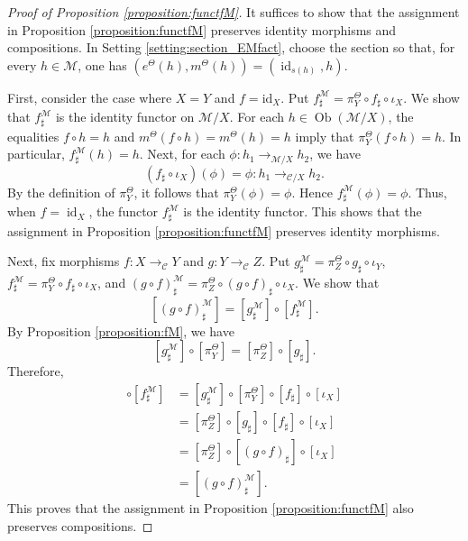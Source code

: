 \documentclass[12pt, a4paper]{amsart}
\theoremstyle{definition}
\newcommand{\id}{\mathop{\mathrm{id}}\nolimits}
\newcommand{\Ob}{\mathop{\mathrm{Ob}}\nolimits}
\begin{document}
\begin{proof}[Proof of Proposition \ref{proposition:functfM}]
It suffices to show that the assignment in Proposition \ref{proposition:functfM} preserves identity morphisms and compositions. In Setting \ref{setting:section_EMfact}, choose the section so that, for every $h \in \mathcal{M}$, one has $(e^\Theta(h),m^\Theta(h)) = (\id_{s(h)},h)$.

First, consider the case where $X = Y$ and $f = \mathrm{id}_X$. Put $f^{\mathcal{M}}_\sharp = \pi_Y^\Theta \circ f_\sharp \circ \iota_X$. We show that $f^\mathcal{M}_\sharp$ is the identity functor on $\mathcal{M}/X$. For each $h \in \Ob(\mathcal{M}/X)$, the equalities $f \circ h = h$ and $m^{\Theta}(f \circ h) = m^{\Theta}(h) = h$ imply that $\pi^\Theta_Y(f \circ h) = h$. In particular, $f^{\mathcal{M}}_\sharp(h) = h$. Next, for each $\phi : h_1 \rightarrow_{\mathcal{M}/X} h_2$, we have
\[
(f_\sharp \circ \iota_X)(\phi) = \phi : h_1 \rightarrow_{\mathcal{C}/X} h_2.
\]
By the definition of $\pi^\Theta_Y$, it follows that $\pi^\Theta_Y(\phi) = \phi$. Hence $f^\mathcal{M}_\sharp(\phi) = \phi$. Thus, when $f = \id_X$, the functor $f^{\mathcal{M}}_\sharp$ is the identity functor. This shows that the assignment in Proposition \ref{proposition:functfM} preserves identity morphisms.

Next, fix morphisms $f : X \rightarrow_{\mathcal{C}} Y$ and $g : Y \rightarrow_{\mathcal{C}} Z$. Put $g^\mathcal{M}_\sharp = \pi^\Theta_Z \circ g_\sharp \circ \iota_Y$, $f^\mathcal{M}_\sharp = \pi^\Theta_Y \circ f_\sharp \circ \iota_X$, and $(g \circ f)^{\mathcal{M}}_\sharp = \pi^\Theta_Z \circ (g \circ f)_\sharp \circ \iota_X$. We show that
\[
[(g \circ f)^{\mathcal{M}}_\sharp] = [g^\mathcal{M}_\sharp] \circ [f^\mathcal{M}_\sharp].
\]
By Proposition \ref{proposition:fM}, we have
\[
[g^{\mathcal{M}}_\sharp] \circ [\pi^\Theta_Y] = [\pi^\Theta_Z] \circ [g_\sharp].
\]
Therefore,
\begin{align*}
[g^{\mathcal{M}}_\sharp] \circ [f^{\mathcal{M}}_\sharp] 
    &= [g^{\mathcal{M}}_\sharp] \circ [\pi^\Theta_Y] \circ [f_\sharp] \circ [\iota_X] \\
    &= [\pi^\Theta_Z] \circ [g_\sharp] \circ [f_\sharp] \circ [\iota_X] \\
    &= [\pi^\Theta_Z] \circ [(g \circ f)_\sharp] \circ [\iota_X] \\
    &= [(g \circ f)^\mathcal{M}_\sharp].
\end{align*}
This proves that the assignment in Proposition \ref{proposition:functfM} also preserves compositions.
\end{proof}
\end{document}
